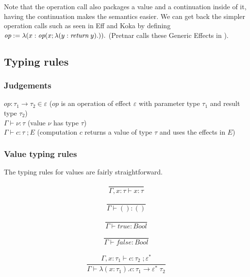 \documentclass[12pt]{article}
\newcommand\eff[0]{\varepsilon}
\newcommand\effs[0]{\eff^*}
\newcommand\eop[0]{\textit{op}}
\newcommand\type[0]{\tau}
\newcommand\tunit[0]{()}
\newcommand\tbool[0]{\textit{Bool}}
\newcommand\tarr[2]{#1 \rightarrow #2}
\newcommand\tarre[3]{#1 \rightarrow #2 \; #3}
\newcommand\val[0]{\nu}
\newcommand\vunit[0]{()}
\newcommand\vtrue[0]{\textit{true}}
\newcommand\vfalse[0]{\textit{false}}
\newcommand\vabs[3]{\lambda(#1 : #2) . #3}
\newcommand\comp[0]{c}
\newcommand\creturn[1]{\textit{return} \; #1}
\newcommand\cop[5]{#1(#2 ; \lambda (#3 : #4) . #5)}
\begin{document}
Note that the operation call also packages a value and a continuation inside of it, having the continuation makes the semantics easier.
We can get back the simpler operation calls such as seen in Eff and Koka by defining $\eop := \vabs{x}{\cop{\eop}{x}{y}{\creturn{y}}}$ (Pretnar calls these Generic Effects in \cite{pretnar}).

\subsection{Typing rules}

\subsubsection{Judgements}
$\eop : \tarr{\type_1}{\type_2} \in \eff$ ($\eop$ is an operation of effect $\eff$ with parameter type $\type_1$ and result type $\type_2$)\\
$\Gamma \vdash \val : \type$ (value $\val$ has type $\type$) \\
$\Gamma \vdash \comp : \type \; ; E$ (computation $\comp$ returns a value of type $\type$ and uses the effects in $E$) \\

\subsubsection{Value typing rules}
The typing rules for values are fairly straightforward. \\
\begin{minipage}{0.25\textwidth}
	\[\frac{
	}{
		\Gamma, x : \type \vdash x : \type
	}\]
\end{minipage}
\begin{minipage}{0.25\textwidth}
	\[\frac{
	}{
		\Gamma \vdash \vunit : \tunit
	}\]
\end{minipage}
\begin{minipage}{0.25\textwidth}
\[\frac{
}{
	\Gamma \vdash \vtrue : \tbool
}\]
\end{minipage}
\begin{minipage}{0.25\textwidth}
 \[\frac{
}{
	\Gamma \vdash \vfalse : \tbool
}\]
\end{minipage}
\[\frac{
	\begin{array}{l}
	\Gamma, x : \type_1 \vdash \comp : \type_2 \; ; \effs
	\end{array}
}{
	\Gamma \vdash \vabs{x}{\type_1}{\comp} : \tarre{\type_1}{\effs}{\type_2}
}\]
\end{document}

